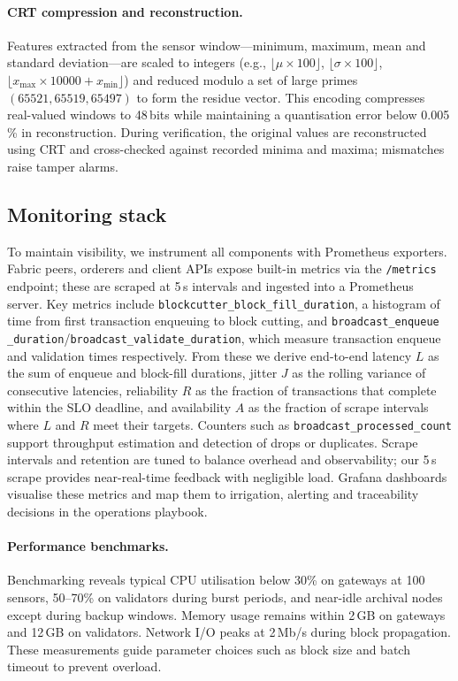 \documentclass[12pt,onecolumn]{IEEEtran} %
\begin{document}
\paragraph{CRT compression and reconstruction.}
Features extracted from the sensor window—minimum, maximum, mean and standard deviation—are scaled to integers (e.g., $\lfloor\mu \times 100\rfloor$, $\lfloor\sigma \times 100\rfloor$, $\lfloor x_{\max}\times 10000 + x_{\min}\rfloor$) and reduced modulo a set of large primes $(65521,65519,65497)$ to form the residue vector. This encoding compresses real-valued windows to 48\,bits while maintaining a quantisation error below 0.005\,\% in reconstruction. During verification, the original values are reconstructed using CRT and cross-checked against recorded minima and maxima; mismatches raise tamper alarms.

\subsection{Monitoring stack}
To maintain visibility, we instrument all components with Prometheus exporters. Fabric peers, orderers and client APIs expose built-in metrics via the \texttt{/metrics} endpoint; these are scraped at 5\,s intervals and ingested into a Prometheus server. Key metrics include \texttt{blockcutter\_block\_fill\_duration}, a histogram of time from first transaction enqueuing to block cutting, and \texttt{broadcast\_enqueue \_duration}/\texttt{broadcast\_validate\_duration}, which measure transaction enqueue and validation times respectively. From these we derive end-to-end latency $L$ as the sum of enqueue and block-fill durations, jitter $J$ as the rolling variance of consecutive latencies, reliability $R$ as the fraction of transactions that complete within the SLO deadline, and availability $A$ as the fraction of scrape intervals where $L$ and $R$ meet their targets. Counters such as \texttt{broadcast\_processed\_count} support throughput estimation and detection of drops or duplicates. Scrape intervals and retention are tuned to balance overhead and observability; our 5\,s scrape provides near-real-time feedback with negligible load. Grafana dashboards visualise these metrics and map them to irrigation, alerting and traceability decisions in the operations playbook.

\paragraph{Performance benchmarks.}
Benchmarking reveals typical CPU utilisation below 30\% on gateways at 100 sensors, 50–70\% on validators during burst periods, and near-idle archival nodes except during backup windows. Memory usage remains within 2\,GB on gateways and 12\,GB on validators. Network I/O peaks at 2\,Mb/s during block propagation. These measurements guide parameter choices such as block size and batch timeout to prevent overload.
\end{document}
